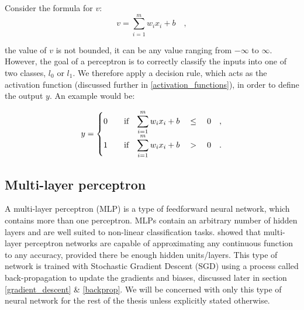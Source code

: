         Consider the formula for $v$: 
        \begin{equation} \label{percetron_linear_transformation}
            v = \displaystyle\sum_{i=1}^{m} w_i x_i + b \quad ,
        \end{equation} 

        the value of $v$ is not bounded, it can be any value ranging from $-\infty$ to $\infty$. However, the goal of a perceptron is to correctly classify the inputs into one of two classes, $l _0$ or $l _1$. We therefore apply a decision rule, which acts as the activation function (discussed further in \ref{activation_functions}),  in order to define the output $y$. An example would be:
        
        \begin{equation} \label{simple_non_linear_transformation}
            y = 
                \begin{cases}
                    0  & \quad $if$ \quad \displaystyle\sum_{i=1}^{m} w_i x_i + b \quad \leq \quad 0 \quad, \\
                    1  & \quad $if$ \quad \displaystyle\sum_{i=1}^{m} w_i x_i + b \quad > \quad 0 \quad. \\
                \end{cases}
        \end{equation} 

        \vspace{20pt}

        \subsection{Multi-layer perceptron}
        A multi-layer perceptron (MLP) is a type of feedforward neural network, which contains more than one perceptron. MLPs contain an arbitrary number of hidden layers and are well suited to non-linear classification tasks. \cite{continuous_function_mapping} showed that multi-layer perceptron networks are capable of approximating any continuous function to any accuracy, provided there be enough hidden units/layers. This type of network is trained with Stochastic Gradient Descent (SGD) using a process called back-propagation to update the gradients and biases, discussed later in section \ref{gradient_descent} \& \ref{backprop}. We will be concerned with only this type of neural network for the rest of the thesis unless explicitly stated otherwise.  

            
        
